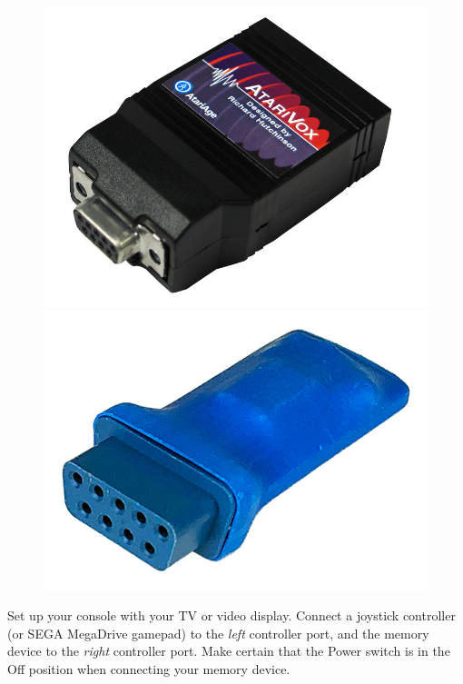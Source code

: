 \documentclass[10pt,twocolumn,openany,article]{memoir}
\begin{document}
\ifdefined\NOSAVE\else
\begin{figure}[b]
  \begin{center}
    \includegraphics[width=\columnwidth]{../Manual/AtariVox.jpeg}
    \includegraphics[width=\columnwidth]{../Manual/SaveKey.jpeg}
  \end{center}
\end{figure}
\fi

Set up  your console with your  TV or video display.  Connect a joystick
controller  (or SEGA  \ifdefined{}\fi{}MegaDrive gamepad)
to  the  \emph{left}  controller port\ifdefined\NOSAVE\else{},  and  the
memory  device to  the \emph{right}  controller port.  Make certain
that  the Power  switch  is in  the Off  position  when connecting  your
memory device\fi{}.
\end{document}
